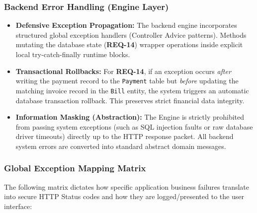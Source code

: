 \subsubsection{Backend Error Handling (Engine Layer)}
\begin{itemize}
	\item \textbf{Defensive Exception Propagation:} The backend engine incorporates structured global exception handlers (Controller Advice patterns). Methods mutating the database state (\textbf{REQ-14}) wrapper operations inside explicit local try-catch-finally runtime blocks.
	\item \textbf{Transactional Rollbacks:} For \textbf{REQ-14}, if an exception occurs \textit{after} writing the payment record to the \texttt{Payment} table but \textit{before} updating the matching invoice record in the \texttt{Bill} entity, the system triggers an automatic database transaction rollback. This preserves strict financial data integrity.
	\item \textbf{Information Masking (Abstraction):} The Engine is strictly prohibited from passing system exceptions (such as SQL injection faults or raw database driver timeouts) directly up to the HTTP response packet. All backend system errors are converted into standard abstract domain messages.
\end{itemize}

\subsubsection{Global Exception Mapping Matrix}
The following matrix dictates how specific application business failures translate into secure HTTP Status codes and how they are logged/presented to the user interface:

